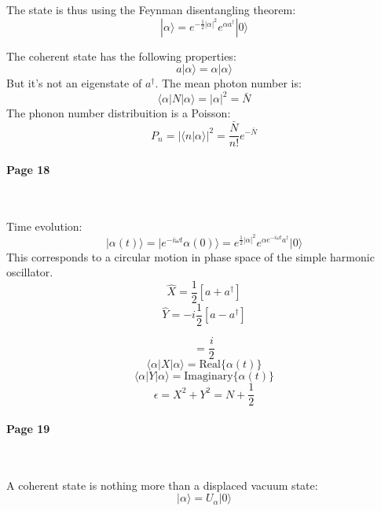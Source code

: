 \documentclass[12pt]{article}
\numberwithin{equation}{subsection}
\newcommand\page[1]{
{
\color{blue}\paragraph{
Page #1
}\mbox{}\\
}
}
\begin{document}
 The state is thus using the Feynman disentangling theorem:
 \begin{equation}
     |\alpha \rangle = e^{-\frac{1}{2}|\alpha|^2} e^{\alpha a^\dagger} | 0 \rangle
 \end{equation}
 
 The coherent state has the following properties:
 \begin{equation}
     a|\alpha\rangle = \alpha | \alpha \rangle 
 \end{equation}
 But it's not an eigenstate of $a^\dagger$. The mean photon number is:
 \begin{equation}
     \langle \alpha|N|\alpha\rangle = |\alpha|^2 = \bar N 
 \end{equation}
 The phonon number distribuition is a Poisson:
 \begin{equation}
     P_n = |\langle n | \alpha \rangle |^2 = \frac{\bar N}{n!} e^{-\bar N}
 \end{equation}
 \page{18}
Time evolution:
\begin{equation}
    |\alpha(t)\rangle  =|e^{-i\omega t}\alpha(0)\rangle =e^{\frac{1}{2}|\alpha|^2} e^{\alpha e^{-i\omega t} a^\dagger} |0\rangle 
\end{equation}
This corresponds to a circular motion in phase space of the simple harmonic oscillator.
\begin{equation}
    \hat X = \frac{1}{2} [a+a^\dagger]
\end{equation}
\begin{equation}
    \hat Y = -i\frac{1}{2} [a-a^\dagger]
\end{equation}

\begin{equation}
    [X,Y] = \frac{i}{2}
\end{equation}
\begin{equation}
\langle \alpha |X | \alpha \rangle = \textrm{Real}\{ \alpha(t)\}
\end{equation}
\begin{equation}
\langle \alpha |Y| \alpha \rangle = \textrm{Imaginary}\{\alpha(t)\}
\end{equation}
\begin{equation}
\epsilon = X^2+ Y^2 = N+ \frac{1}{2}
\end{equation}
\page{19}
A coherent state is nothing more than a displaced vacuum state:
\begin{equation}
    |\alpha\rangle = U_\alpha |0\rangle
\end{equation}
\end{document}
